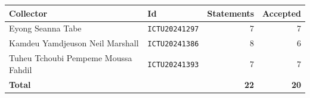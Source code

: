 \begin{tabular}{@{}llrr@{}}
\toprule
\textbf{Collector} & \textbf{Id} & \textbf{Statements} & \textbf{Accepted} \\
\midrule
Eyong Seanna Tabe & \texttt{ICTU20241297} & 7 & 7 \\
Kamdeu Yamdjeuson Neil Marshall & \texttt{ICTU20241386} & 8 & 6 \\
Tuheu Tchoubi Pempeme Moussa Fahdil & \texttt{ICTU20241393} & 7 & 7 \\
\midrule
\textbf{Total} & & \textbf{22} & \textbf{20} \\
\bottomrule
\end{tabular}
